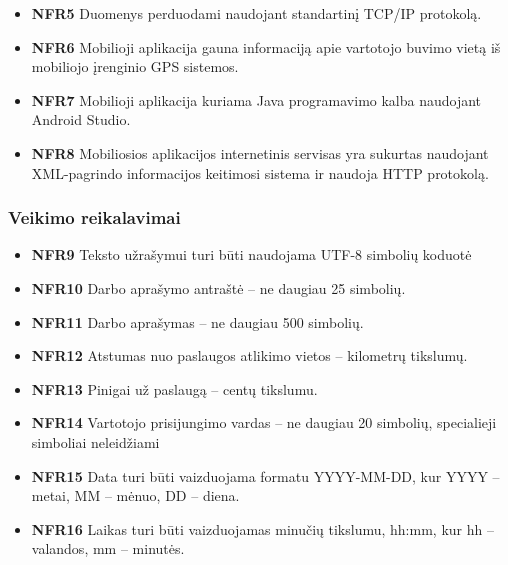 \documentclass{VUMIFPSbakalaurinis}
\begin{document}
\begin{itemize}
	\item \textbf{NFR5} Duomenys perduodami naudojant standartinį TCP/IP protokolą.
\end{itemize}

\begin{itemize}
	\item \textbf{NFR6} Mobilioji aplikacija gauna informaciją apie vartotojo buvimo vietą iš mobiliojo įrenginio GPS sistemos.
\end{itemize}

\begin{itemize}
	\item \textbf{NFR7} Mobilioji aplikacija kuriama Java programavimo kalba naudojant Android Studio.
	\item \textbf{NFR8} Mobiliosios aplikacijos internetinis servisas yra sukurtas naudojant XML-pagrindo informacijos keitimosi sistema ir naudoja HTTP protokolą.
\end{itemize}

\subsubsection{Veikimo reikalavimai}
\begin{itemize}
	\item \textbf{NFR9} Teksto užrašymui turi būti naudojama UTF-8 simbolių koduotė
	\item \textbf{NFR10} Darbo aprašymo antraštė – ne daugiau 25 simbolių.
	\item \textbf{NFR11} Darbo aprašymas – ne daugiau 500 simbolių.
	\item \textbf{NFR12} Atstumas nuo paslaugos atlikimo vietos – kilometrų tikslumų.
	\item \textbf{NFR13} Pinigai už paslaugą – centų tikslumu.
	\item \textbf{NFR14} Vartotojo prisijungimo vardas – ne daugiau 20 simbolių, specialieji simboliai neleidžiami
	\item \textbf{NFR15} Data turi būti vaizduojama formatu YYYY-MM-DD, kur YYYY – metai, MM – mėnuo, DD – diena.
	\item \textbf{NFR16} Laikas turi būti vaizduojamas minučių tikslumu, hh:mm, kur hh – valandos, mm – minutės.
\end{itemize}
\end{document}
